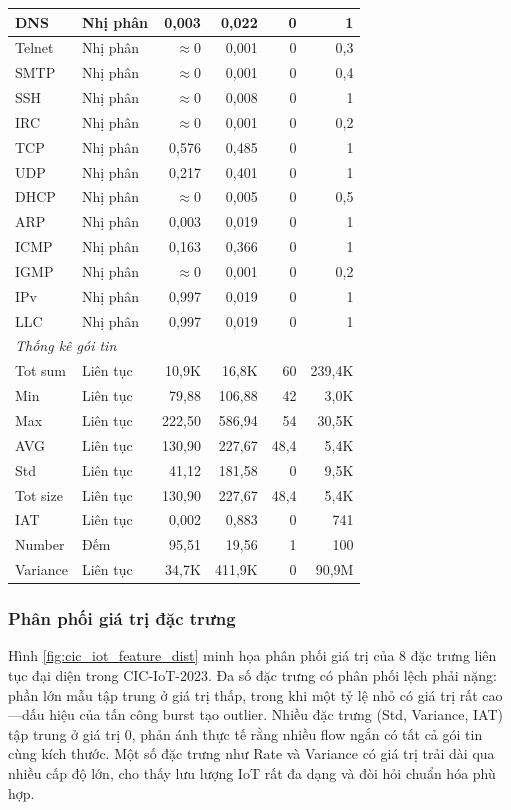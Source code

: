 \begin{footnotesize}
\begin{longtable}{|l|l|r|r|r|r|}
\hline
DNS & Nhị phân & 0,003 & 0,022 & 0 & 1 \\
\hline
Telnet & Nhị phân & $\approx$0 & 0,001 & 0 & 0,3 \\
\hline
SMTP & Nhị phân & $\approx$0 & 0,001 & 0 & 0,4 \\
\hline
SSH & Nhị phân & $\approx$0 & 0,008 & 0 & 1 \\
\hline
IRC & Nhị phân & $\approx$0 & 0,001 & 0 & 0,2 \\
\hline
TCP & Nhị phân & 0,576 & 0,485 & 0 & 1 \\
\hline
UDP & Nhị phân & 0,217 & 0,401 & 0 & 1 \\
\hline
DHCP & Nhị phân & $\approx$0 & 0,005 & 0 & 0,5 \\
\hline
ARP & Nhị phân & 0,003 & 0,019 & 0 & 1 \\
\hline
ICMP & Nhị phân & 0,163 & 0,366 & 0 & 1 \\
\hline
IGMP & Nhị phân & $\approx$0 & 0,001 & 0 & 0,2 \\
\hline
IPv & Nhị phân & 0,997 & 0,019 & 0 & 1 \\
\hline
LLC & Nhị phân & 0,997 & 0,019 & 0 & 1 \\
\hline
\multicolumn{6}{|l|}{\textit{Thống kê gói tin}} \\
\hline
Tot sum & Liên tục & 10,9K & 16,8K & 60 & 239,4K \\
\hline
Min & Liên tục & 79,88 & 106,88 & 42 & 3,0K \\
\hline
Max & Liên tục & 222,50 & 586,94 & 54 & 30,5K \\
\hline
AVG & Liên tục & 130,90 & 227,67 & 48,4 & 5,4K \\
\hline
Std & Liên tục & 41,12 & 181,58 & 0 & 9,5K \\
\hline
Tot size & Liên tục & 130,90 & 227,67 & 48,4 & 5,4K \\
\hline
IAT & Liên tục & 0,002 & 0,883 & 0 & 741 \\
\hline
Number & Đếm & 95,51 & 19,56 & 1 & 100 \\
\hline
Variance & Liên tục & 34,7K & 411,9K & 0 & 90,9M \\
\hline
\end{longtable}
\end{footnotesize}

\subsubsection{Phân phối giá trị đặc trưng}
\label{subsec:eda_value_dist}
Hình \ref{fig:cic_iot_feature_dist} minh họa phân phối giá trị của 8 đặc trưng liên tục đại diện trong CIC-IoT-2023. Đa số đặc trưng có phân phối lệch phải nặng: phần lớn mẫu tập trung ở giá trị thấp, trong khi một tỷ lệ nhỏ có giá trị rất cao---dấu hiệu của tấn công burst tạo outlier. Nhiều đặc trưng (Std, Variance, IAT) tập trung ở giá trị 0, phản ánh thực tế rằng nhiều flow ngắn có tất cả gói tin cùng kích thước. Một số đặc trưng như Rate và Variance có giá trị trải dài qua nhiều cấp độ lớn, cho thấy lưu lượng IoT rất đa dạng và đòi hỏi chuẩn hóa phù hợp.

